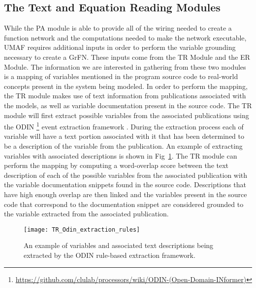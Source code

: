 \subsection{The Text and Equation Reading Modules \label{sec:ter_overview}}
While the PA module is able to provide all of the wiring needed to create a function network and the computations needed to make the network executable, UMAF requires additional inputs in order to perform the variable grounding necessary to create a GrFN.
These inputs come from the TR Module and the ER Module.
The information we are interested in gathering from these two modules is a mapping of variables mentioned in the program source code to real-world concepts present in the system being modeled.
In order to perform the mapping, the TR module makes use of text information from publications associated with the models, as well as variable documentation present in the source code.
The TR module will first extract possible variables from the associated publications using the ODIN \footnote{\url{https://github.com/clulab/processors/wiki/ODIN-(Open-Domain-INformer)}} event extraction framework \citep{valenzuela2015Odin}.
During the extraction process each of variable will have a text portion associated with it that has been determined to be a description of the variable from the publication.
An example of extracting variables with associated descriptions is shown in Fig~\ref{fig:odin_extraction_example}.
The TR module can perform the mapping by computing a word-overlap score between the text description of each of the possible variables from the associated publication with the variable documentation snippets found in the source code.
Descriptions that have high enough overlap are then linked and the variables present in the source code that correspond to the documentation snippet are considered grounded to the variable extracted from the associated publication.

\begin{figure}[!htbp]
    \centering
    \texttt{[image: TR\_Odin\_extraction\_rules]}%
    \caption[Example Variable Extraction via ODIN]{An example of variables and associated text descriptions being extracted by the ODIN rule-based extraction framework.}
    \label{fig:odin_extraction_example}
\end{figure}

